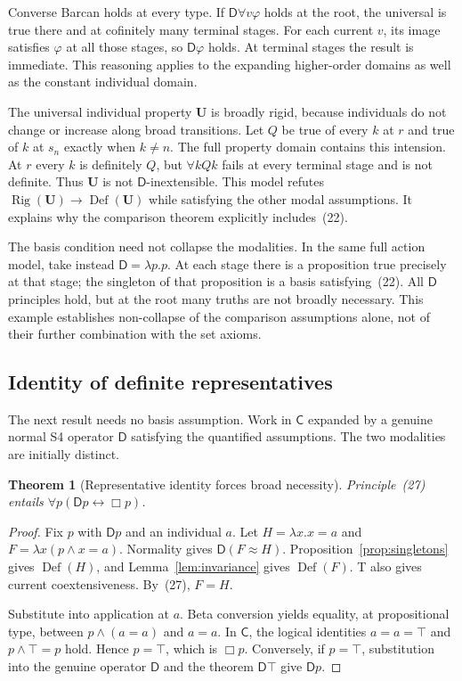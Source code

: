 \documentclass[11pt]{article}
\newtheorem{theorem}{Theorem}[section]
\theoremstyle{definition}
\newcommand{\D}{\mathsf D}
\newcommand{\Rig}{\operatorname{Rig}}
\newcommand{\Def}{\operatorname{Def}}
\newcommand{\C}{\mathsf C}
\newcommand{\U}{\mathbf U}
\newcommand{\rel}{\mathbin{\approx}}
\numberwithin{equation}{section}
\begin{document}
Converse Barcan holds at every type. If $\D \forall v\varphi$ holds at the root, the universal is true there and at cofinitely many terminal stages. For each current $v$, its image satisfies $\varphi$ at all those stages, so $\D \varphi$ holds. At terminal stages the result is immediate. This reasoning applies to the expanding higher-order domains as well as the constant individual domain.

The universal individual property $\U$ is broadly rigid, because individuals do not change or increase along broad transitions. Let $Q$ be true of every $k$ at $r$ and true of $k$ at $s_n$ exactly when $k\ne n$. The full property domain contains this intension. At $r$ every $k$ is definitely $Q$, but $\forall kQk$ fails at every terminal stage and is not definite. Thus $\U$ is not $\D $-inextensible. This model refutes $\Rig(\U)\rightarrow\Def(\U)$ while satisfying the other modal assumptions. It explains why the comparison theorem explicitly includes~\textup{(22)}.

The basis condition need not collapse the modalities. In the same full action model, take instead $\D =\lambda p.p$. At each stage there is a proposition true precisely at that stage; the singleton of that proposition is a basis satisfying~\textup{(22)}. All $\D $ principles hold, but at the root many truths are not broadly necessary. This example establishes non-collapse of the comparison assumptions alone, not of their further combination with the set axioms.

\subsection{Identity of definite representatives}

The next result needs no basis assumption. Work in $\C$ expanded by a genuine normal S4 operator $\D $ satisfying the quantified assumptions. The two modalities are initially distinct.

\begin{theorem}[Representative identity forces broad necessity]\label{thm:collapse}
Principle~\textup{(27)} entails $\forall p(\D p\leftrightarrow\Box p)$.
\end{theorem}
\begin{proof}
Fix $p$ with $\D p$ and an individual $a$. Let $H=\lambda x.x=a$ and $F=\lambda x(p\wedge x=a)$. Normality gives $\D (F\rel H)$. Proposition~\ref{prop:singletons} gives $\Def(H)$, and Lemma~\ref{lem:invariance} gives $\Def(F)$. T also gives current coextensiveness. By~\textup{(27)}, $F=H$.

Substitute into application at $a$. Beta conversion yields equality, at propositional type, between $p\wedge(a=a)$ and $a=a$. In $\C$, the logical identities $a=a=\top$ and $p\wedge\top=p$ hold. Hence $p=\top$, which is $\Box p$. Conversely, if $p=\top$, substitution into the genuine operator $\D $ and the theorem $\D \top$ give $\D p$.
\end{proof}
\end{document}
